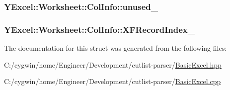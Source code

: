 \subsubsection[{unused\+\_\+}]{ Y\+Excel\+::\+Worksheet\+::\+Col\+Info\+::unused\+\_\+}\label{struct_y_excel_1_1_worksheet_1_1_col_info_a4beeec6282ca2ef616ba7c52ce5c2e98}
\hypertarget{struct_y_excel_1_1_worksheet_1_1_col_info_a33344d27ddb8a8dbb4b11e7f398b8360}{}
\subsubsection[{X\+F\+Record\+Index\+\_\+}]{ Y\+Excel\+::\+Worksheet\+::\+Col\+Info\+::\+X\+F\+Record\+Index\+\_\+}\label{struct_y_excel_1_1_worksheet_1_1_col_info_a33344d27ddb8a8dbb4b11e7f398b8360}


The documentation for this struct was generated from the following files\+:\begin{DoxyCompactItemize}
\item 
C\+:/cygwin/home/\+Engineer/\+Development/cutlist-\/parser/\hyperlink{_basic_excel_8hpp}{Basic\+Excel.\+hpp}\item 
C\+:/cygwin/home/\+Engineer/\+Development/cutlist-\/parser/\hyperlink{_basic_excel_8cpp}{Basic\+Excel.\+cpp}\end{DoxyCompactItemize}

